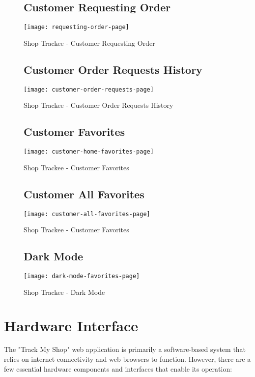 \begin{figure}[h]
	\subsection{Customer Requesting Order}
	\centering
	\texttt{[image: requesting-order-page]}
	\caption{Shop Trackee - Customer Requesting Order}
\end{figure}
\newpage

\begin{figure}[h]
	\subsection{Customer Order Requests History}
	\centering
	\texttt{[image: customer-order-requests-page]}
	\caption{Shop Trackee - Customer Order Requests History}
\end{figure}

\begin{figure}[h]
	\subsection{Customer Favorites}
	\centering
	\texttt{[image: customer-home-favorites-page]}
	\caption{Shop Trackee - Customer Favorites}
\end{figure}
\pagebreak
\begin{figure}[h]
	\subsection{Customer All Favorites}
	\centering
	\texttt{[image: customer-all-favorites-page]}
	\caption{Shop Trackee - Customer Favorites}
\end{figure}


\begin{figure}[h]
	\subsection{Dark Mode}
	\centering
	\texttt{[image: dark-mode-favorites-page]}
	\caption{Shop Trackee - Dark Mode}
\end{figure}

\pagebreak
\section{Hardware Interface}
The "Track My Shop" web application is primarily a software-based system that relies on internet connectivity and web browsers to function. However, there are a few essential hardware components and interfaces that enable its operation:

